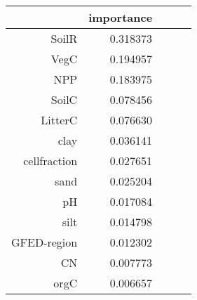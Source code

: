 \begin{table}[h]
\centering
\label{table:5}
\begin{tabular}{rrrrr}
\toprule
 & importance \\
\midrule
SoilR & 0.318373 \\
VegC & 0.194957 \\
NPP & 0.183975 \\
SoilC & 0.078456 \\
LitterC & 0.076630 \\
clay & 0.036141 \\
cellfraction & 0.027651 \\
sand & 0.025204 \\
pH & 0.017084 \\
silt & 0.014798 \\
GFED-region & 0.012302 \\
CN & 0.007773 \\
orgC & 0.006657 \\
\bottomrule
\end{tabular}
\end{table}
